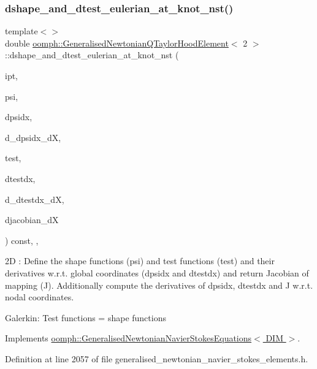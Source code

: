\subsubsection{\texorpdfstring{dshape\+\_\+and\+\_\+dtest\+\_\+eulerian\+\_\+at\+\_\+knot\+\_\+nst()}{dshape\_and\_dtest\_eulerian\_at\_knot\_nst()}\hspace{0.1cm}{\footnotesize\ttfamily [3/4]}}
{\footnotesize\ttfamily template$<$$>$ \\
double \hyperlink{classoomph_1_1GeneralisedNewtonianQTaylorHoodElement}{oomph\+::\+Generalised\+Newtonian\+Q\+Taylor\+Hood\+Element}$<$ 2 $>$\+::dshape\+\_\+and\+\_\+dtest\+\_\+eulerian\+\_\+at\+\_\+knot\+\_\+nst (\begin{DoxyParamCaption}\item[{const unsigned \&}]{ipt,  }\item[{\hyperlink{classoomph_1_1Shape}{Shape} \&}]{psi,  }\item[{\hyperlink{classoomph_1_1DShape}{D\+Shape} \&}]{dpsidx,  }\item[{\hyperlink{classoomph_1_1RankFourTensor}{Rank\+Four\+Tensor}$<$ double $>$ \&}]{d\+\_\+dpsidx\+\_\+dX,  }\item[{\hyperlink{classoomph_1_1Shape}{Shape} \&}]{test,  }\item[{\hyperlink{classoomph_1_1DShape}{D\+Shape} \&}]{dtestdx,  }\item[{\hyperlink{classoomph_1_1RankFourTensor}{Rank\+Four\+Tensor}$<$ double $>$ \&}]{d\+\_\+dtestdx\+\_\+dX,  }\item[{\hyperlink{classoomph_1_1DenseMatrix}{Dense\+Matrix}$<$ double $>$ \&}]{djacobian\+\_\+dX }\end{DoxyParamCaption}) const\hspace{0.3cm}{\ttfamily [inline]}, {\ttfamily [protected]}, {\ttfamily [virtual]}}

2D \+: Define the shape functions (psi) and test functions (test) and their derivatives w.\+r.\+t. global coordinates (dpsidx and dtestdx) and return Jacobian of mapping (J). Additionally compute the derivatives of dpsidx, dtestdx and J w.\+r.\+t. nodal coordinates.

Galerkin\+: Test functions = shape functions 

Implements \hyperlink{classoomph_1_1GeneralisedNewtonianNavierStokesEquations_a24a93b73dba66e04eabb9b37a9360daa}{oomph\+::\+Generalised\+Newtonian\+Navier\+Stokes\+Equations$<$ D\+I\+M $>$}.



Definition at line 2057 of file generalised\+\_\+newtonian\+\_\+navier\+\_\+stokes\+\_\+elements.\+h.



